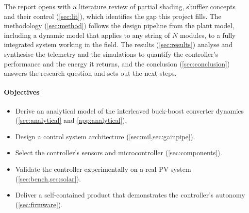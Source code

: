 The report opens with a literature review of partial shading, shuffler concepts and their control (\cref{sec:lit}), which identifies the gap this project fills. The methodology (\cref{sec:method}) follows the design pipeline from the plant model, including a dynamic model that applies to any string of $N$ modules, to a fully integrated system working in the field. The results (\cref{sec:results}) analyse and synthesise the telemetry and the simulations to quantify the controller's performance and the energy it returns, and the conclusion (\cref{sec:conclusion}) answers the research question and sets out the next steps.

\paragraph{Objectives}
\begin{itemize}
  \item Derive an analytical model of the interleaved buck-boost converter dynamics (\cref{sec:analytical} and \cref{app:analytical}).
  \item Design a control system architecture (\cref{sec:mil,sec:gainpipe}).
  \item Select the controller's sensors and microcontroller (\cref{sec:components}).
  \item Validate the controller experimentally on a real PV system (\cref{sec:bench,sec:solar}).
  \item Deliver a self-contained product that demonstrates the controller's autonomy (\cref{sec:firmware}).
\end{itemize}
